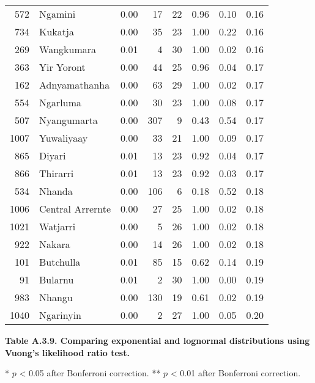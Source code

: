 \begin{longtable}[]{@{}rlrrrrrr@{}}
572 & Ngamini & 0.00 & 17 & 22 & 0.96 & 0.10 & 0.16\tabularnewline
734 & Kukatja & 0.00 & 35 & 23 & 1.00 & 0.22 & 0.16\tabularnewline
269 & Wangkumara & 0.01 & 4 & 30 & 1.00 & 0.02 & 0.16\tabularnewline
363 & Yir Yoront & 0.00 & 44 & 25 & 0.96 & 0.04 & 0.17\tabularnewline
162 & Adnyamathanha & 0.00 & 63 & 29 & 1.00 & 0.02 & 0.17\tabularnewline
554 & Ngarluma & 0.00 & 30 & 23 & 1.00 & 0.08 & 0.17\tabularnewline
507 & Nyangumarta & 0.00 & 307 & 9 & 0.43 & 0.54 & 0.17\tabularnewline
1007 & Yuwaliyaay & 0.00 & 33 & 21 & 1.00 & 0.09 & 0.17\tabularnewline
865 & Diyari & 0.01 & 13 & 23 & 0.92 & 0.04 & 0.17\tabularnewline
866 & Thirarri & 0.01 & 13 & 23 & 0.92 & 0.03 & 0.17\tabularnewline
534 & Nhanda & 0.00 & 106 & 6 & 0.18 & 0.52 & 0.18\tabularnewline
1006 & Central Arrernte & 0.00 & 27 & 25 & 1.00 & 0.02 &
0.18\tabularnewline
1021 & Watjarri & 0.00 & 5 & 26 & 1.00 & 0.02 & 0.18\tabularnewline
922 & Nakara & 0.00 & 14 & 26 & 1.00 & 0.02 & 0.18\tabularnewline
101 & Butchulla & 0.01 & 85 & 15 & 0.62 & 0.14 & 0.19\tabularnewline
91 & Bularnu & 0.01 & 2 & 30 & 1.00 & 0.00 & 0.19\tabularnewline
983 & Nhangu & 0.00 & 130 & 19 & 0.61 & 0.02 & 0.19\tabularnewline
1040 & Ngarinyin & 0.00 & 2 & 27 & 1.00 & 0.05 & 0.20\tabularnewline
\bottomrule
\end{longtable}

\newpage

\textbf{Table A.3.9. Comparing exponential and lognormal distributions
using Vuong's likelihood ratio test.}

* \(p\) \textless{} 0.05 after Bonferroni correction. ** \(p\)
\textless{} 0.01 after Bonferroni correction.

